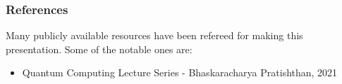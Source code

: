 \begin{frame}\frametitle{References}
Many publicly available resources have been refereed for making this presentation. Some of the notable ones are:
\small
\begin{itemize}
\item Quantum Computing Lecture Series - Bhaskaracharya Pratishthan, 2021
\end{itemize}
\end{frame}

